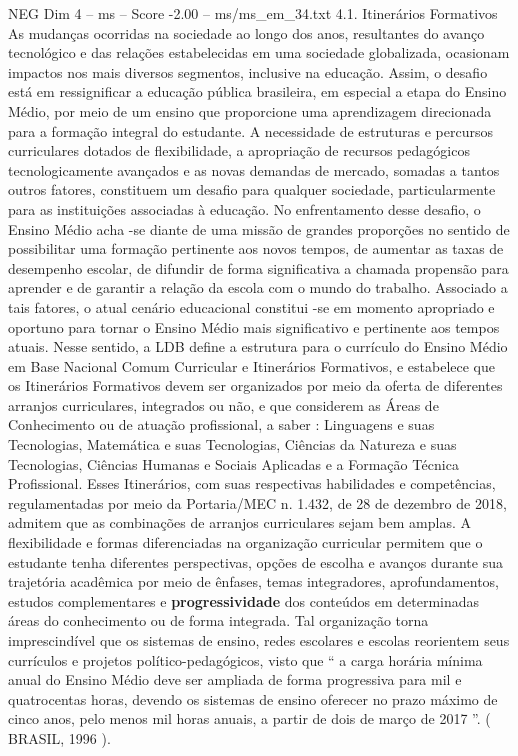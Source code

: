 \begin{textsample}{NEG Dim 4 – ms – Score -2.00 – ms/ms\_em\_34.txt}  \label{ex:f4_neg_135}
4.1.
Itinerários Formativos As mudanças ocorridas na sociedade ao longo dos anos, resultantes do avanço tecnológico e das relações estabelecidas em uma sociedade globalizada, ocasionam impactos nos mais diversos segmentos, inclusive na educação.
Assim, o desafio está em ressignificar a educação pública brasileira, em especial a etapa do Ensino Médio, por meio de um ensino que proporcione uma aprendizagem direcionada para a formação integral do estudante.
A necessidade de estruturas e percursos curriculares dotados de flexibilidade, a apropriação de recursos pedagógicos tecnologicamente avançados e as novas demandas de mercado, somadas a tantos outros fatores, constituem um desafio para qualquer sociedade, particularmente para as instituições associadas à educação.
No enfrentamento desse desafio, o Ensino Médio acha -se diante de uma missão de grandes proporções no sentido de possibilitar uma formação pertinente aos novos tempos, de aumentar as taxas de desempenho escolar, de difundir de forma significativa a chamada propensão para aprender e de garantir a relação da escola com o mundo do trabalho.
Associado a tais fatores, o atual cenário educacional constitui -se em momento apropriado e oportuno para tornar o Ensino Médio mais significativo e pertinente aos tempos atuais.
Nesse sentido, a LDB define a estrutura para o currículo do Ensino Médio em Base Nacional Comum Curricular e Itinerários Formativos, e estabelece que os Itinerários Formativos devem ser organizados por meio da oferta de diferentes arranjos curriculares, integrados ou não, e que considerem as Áreas de Conhecimento ou de atuação profissional, a saber : Linguagens e suas Tecnologias, Matemática e suas Tecnologias, Ciências da Natureza e suas Tecnologias, Ciências Humanas e Sociais Aplicadas e a Formação Técnica Profissional.
Esses Itinerários, com suas respectivas habilidades e competências, regulamentadas por meio da Portaria/MEC n. 1.432, de 28 de dezembro de 2018, admitem que as combinações de arranjos curriculares sejam bem amplas.
A flexibilidade e formas diferenciadas na organização curricular permitem que o estudante tenha diferentes perspectivas, opções de escolha e avanços durante sua trajetória acadêmica por meio de ênfases, temas integradores, aprofundamentos, estudos complementares e \textbf{progressividade} dos conteúdos em determinadas áreas do conhecimento ou de forma integrada.
Tal organização torna imprescindível que os sistemas de ensino, redes escolares e escolas reorientem seus currículos e projetos político-pedagógicos, visto que “ a carga horária mínima anual do Ensino Médio deve ser ampliada de forma progressiva para mil e quatrocentas horas, devendo os sistemas de ensino oferecer no prazo máximo de cinco anos, pelo menos mil horas anuais, a partir de dois de março de 2017 ”. ( BRASIL, 1996 ).

\end{textsample}
